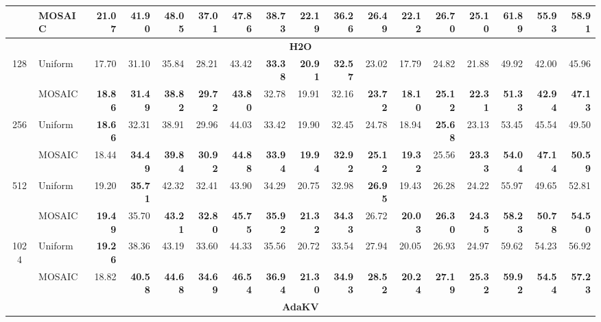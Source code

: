 \begin{table}[tp]
\begin{tabular}{@{} c l rrrr rrrr rrrr rrr @{}}
     & MOSAIC & \textbf{21.07} & 41.90 & \textbf{48.05} & \textbf{37.01} & \textbf{47.86} & \textbf{38.73} & \textbf{22.19} & \textbf{36.26} & \textbf{26.49} & 22.12 & \textbf{26.70} & \textbf{25.10} & \textbf{61.89} & \textbf{55.93} & \textbf{58.91} \\
    \midrule
    \multicolumn{17}{c}{\textbf{H2O}} \\
    \midrule
    \multirow{2}{*}{128} & Uniform & 17.70 & 31.10 & 35.84 & 28.21 & 43.42 & \textbf{33.38} & \textbf{20.91} & \textbf{32.57} & 23.02 & 17.79 & 24.82 & 21.88 & 49.92 & 42.00 & 45.96 \\
     & MOSAIC & \textbf{18.86} & \textbf{31.49} & \textbf{38.82} & \textbf{29.72} & \textbf{43.80} & 32.78 & 19.91 & 32.16 & \textbf{23.72} & \textbf{18.10} & \textbf{25.12} & \textbf{22.31} & \textbf{51.33} & \textbf{42.94} & \textbf{47.13} \\
    \cmidrule(l){1-17}
    \multirow{2}{*}{256} & Uniform & \textbf{18.66} & 32.31 & 38.91 & 29.96 & 44.03 & 33.42 & 19.90 & 32.45 & 24.78 & 18.94 & \textbf{25.68} & 23.13 & 53.45 & 45.54 & 49.50 \\
     & MOSAIC & 18.44 & \textbf{34.49} & \textbf{39.84} & \textbf{30.92} & \textbf{44.88} & \textbf{33.94} & \textbf{19.94} & \textbf{32.92} & \textbf{25.12} & \textbf{19.32} & 25.56 & \textbf{23.33} & \textbf{54.04} & \textbf{47.14} & \textbf{50.59} \\
    \cmidrule(l){1-17}
    \multirow{2}{*}{512} & Uniform & 19.20 & \textbf{35.71} & 42.32 & 32.41 & 43.90 & 34.29 & 20.75 & 32.98 & \textbf{26.95} & 19.43 & 26.28 & 24.22 & 55.97 & 49.65 & 52.81 \\
     & MOSAIC & \textbf{19.49} & 35.70 & \textbf{43.21} & \textbf{32.80} & \textbf{45.75} & \textbf{35.92} & \textbf{21.32} & \textbf{34.33} & 26.72 & \textbf{20.03} & \textbf{26.30} & \textbf{24.35} & \textbf{58.23} & \textbf{50.78} & \textbf{54.50} \\
    \cmidrule(l){1-17}
    \multirow{2}{*}{1024} & Uniform & \textbf{19.26} & 38.36 & 43.19 & 33.60 & 44.33 & 35.56 & 20.72 & 33.54 & 27.94 & 20.05 & 26.93 & 24.97 & 59.62 & 54.23 & 56.92 \\
     & MOSAIC & 18.82 & \textbf{40.58} & \textbf{44.68} & \textbf{34.69} & \textbf{46.54} & \textbf{36.94} & \textbf{21.30} & \textbf{34.93} & \textbf{28.52} & \textbf{20.24} & \textbf{27.19} & \textbf{25.32} & \textbf{59.92} & \textbf{54.54} & \textbf{57.23} \\
    \midrule
    \multicolumn{17}{c}{\textbf{AdaKV}} \\

\end{tabular}
\end{table}
